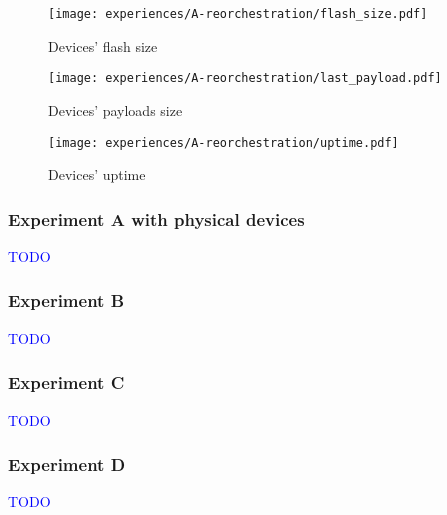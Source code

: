 \begin{figure}[h]
\centering
\texttt{[image: experiences/A-reorchestration/flash\_size.pdf]}
\caption[Devices' flash size]{Devices' flash size}\label{fig:reorchestration_flash_size}
\end{figure}

\begin{figure}[h]
\centering
\texttt{[image: experiences/A-reorchestration/last\_payload.pdf]}
\caption[Devices' payloads size]{Devices' payloads size}\label{fig:reorchestration_last_payload}
\end{figure}

\begin{figure}[h]
\centering
\texttt{[image: experiences/A-reorchestration/uptime.pdf]}
\caption[Devices' uptime]{Devices' uptime}\label{fig:reorchestration_uptime}
\end{figure}


\subsubsection{Experiment A with physical devices}

\textcolor{blue}{TODO}


\subsubsection{Experiment B}

\textcolor{blue}{TODO}


\subsubsection{Experiment C}

\textcolor{blue}{TODO}


\subsubsection{Experiment D}

\textcolor{blue}{TODO}


